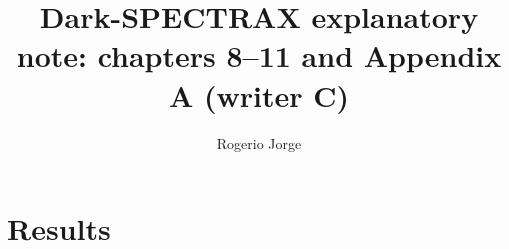 \documentclass[11pt,a4paper]{report}
\title{Dark-SPECTRAX explanatory note: chapters 8--11 and Appendix A (writer C)}
\author{Rogerio Jorge}
\begin{document}
\maketitle
\part{Results}\label{part:results}

\appendix


\end{document}
